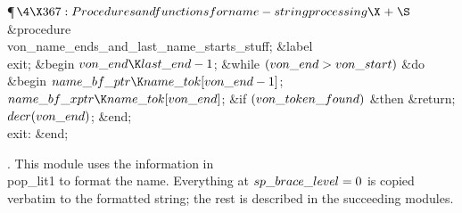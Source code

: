 \Y\P$\4\X367:Procedures and functions for name-string processing\X\mathrel{+}%
\S$\6
\4\&{procedure}\1\  \\{von\_name\_ends\_and\_last\_name\_starts\_stuff};\6
\4\&{label} \\{exit};\2\6
\&{begin} \6
$\\{von\_end}\K\\{last\_end}-1$;\6
\&{while} $(\\{von\_end}>\\{von\_start})$ \1\&{do}\6
\&{begin} $\\{name\_bf\_ptr}\K\\{name\_tok}[\\{von\_end}-1]$;\5
$\\{name\_bf\_xptr}\K\\{name\_tok}[\\{von\_end}]$;\6
\&{if} $(\\{von\_token\_found})$ \1\&{then}\5
\&{return};\2\6
$\\{decr}(\\{von\_end})$;\6
\&{end};\2\6
\4\\{exit}: \&{end};\par
\fi

.
This module uses the information in \\{pop\_lit1} to format the name.
Everything at $\\{sp\_brace\_level}=0$ is copied verbatim to the formatted
string; the rest is described in the succeeding modules.

